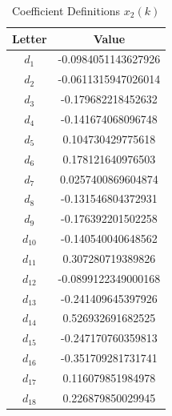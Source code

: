 \begin{table}[H]
\centering
\caption{Coefficient Definitions $x_{2}(k)$}
\label{tab:coefficients2}
\begin{tabular}{|c|c|}
\hline
\textbf{Letter} & \textbf{Value} \\
\hline
$d_1$ & -0.0984051143627926 \\
$d_2$ & -0.0611315947026014 \\
$d_3$ & -0.179682218452632 \\
$d_4$ & -0.141674068096748 \\
$d_5$ & 0.104730429775618 \\
$d_6$ & 0.178121640976503 \\
$d_7$ & 0.0257400869604874 \\
$d_8$ & -0.131546804372931 \\
$d_9$ & -0.176392201502258 \\
$d_{10}$ & -0.140540040648562 \\
$d_{11}$ & 0.307280719389826 \\
$d_{12}$ & -0.0899122349000168 \\
$d_{13}$ & -0.241409645397926 \\
$d_{14}$ & 0.526932691682525 \\
$d_{15}$ & -0.247170760359813 \\
$d_{16}$ & -0.351709281731741 \\
$d_{17}$ & 0.116079851984978 \\
$d_{18}$ & 0.226879850029945 \\
\hline
\end{tabular}
\end{table}

